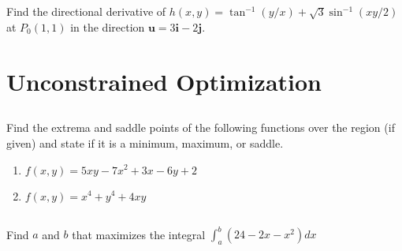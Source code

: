 \documentclass[letterpaper, 11pt]{article}
\begin{document}
\subsection{} Find the directional derivative of $h(x,y) = \tan^{-1} (y/x) + \sqrt{3} \sin^{-1} (xy/2)$ at $P_0(1,1)$ in the direction $\bm{u} = 3\bm{i} - 2 \bm{j}$. 

\section{Unconstrained Optimization}
\subsection{} Find the extrema and saddle points of the following functions over the region (if given) and state if it is a minimum, maximum, or saddle. 
\begin{enumerate}[label=(\alph*)]
\item $f(x,y) = 5xy - 7x^2+3x - 6y +2$

\item $f(x,y) = x^4 +y^4 +4xy$

\end{enumerate}

\subsection{} Find $a$ and $b$ that maximizes the integral $\int_a^b (24 - 2x - x^2)dx$
\end{document}
